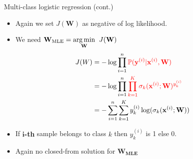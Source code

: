\documentclass[serif, aspectratio=169]{beamer}
\begin{document}
\begin{frame}{Multi-class logistic regression (cont.)}
    \begin{itemize}
        \item Again we set $J(\mathbf{W})$ as negative of log likelihood.
        \item We need $\mathbf{W}_{\text{MLE}} = \underset{\mathbf{W}}{\arg\min} \hspace{0.2cm} J(\mathbf{W})$
        \begin{align*}
            J(W) &= -\log \prod_{i=1}^{n} \textcolor{red}{\mathbb{P}(\mathbf{y}^{(i)}|\mathbf{x}^{(i)}, \mathbf{W})} \\
            &= -\log \prod_{i=1}^{n}\textcolor{red}{\prod_{k=1}^{K}\sigma _k(\mathbf{x}^{(i)}; \mathbf{W})^{y_k^{(i)}} }\\
            &= -\sum_{i=1}^{n}\sum_{k=1}^{K}y_k^{(i)} \log (\sigma _k(\mathbf{x}^{(i)}; \mathbf{W}))
        \end{align*}
        \item If \textbf{$\textbf{i}$-th} sample belongs to class $k$ then $y^{(i)}_k$ is 1 else 0.
        \item Again no closed-from solution for $\mathbf{W_{\text{MLE}}}$
    \end{itemize}
    
\end{frame}
\end{document}
